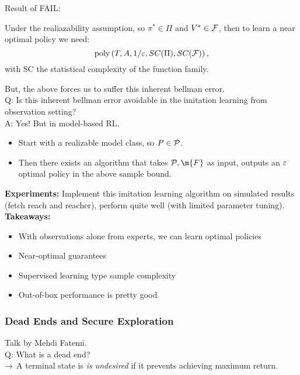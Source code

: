 Result of FAIL:
\begin{theorem}
Under the realiazability assumption, so $\pi^* \in \Pi$ and $V^* \in \mathcal{F}$, then to learn a near optimal policy we need:
\[
\text{poly}\left(T, A, 1/\varepsilon, SC(\Pi), SC(\mathcal{F})\right),
\]
with SC the statistical complexity of the function family.
\end{theorem}

But, the above forces us to suffer this inherent bellman error. \\

Q: Is this inherent bellman error avoidable in the imitation learning from observation setting? \\

A: Yes! But in model-based RL.
\begin{itemize}
    \item Start with a realizable model class, so $P \in \mathcal{P}$.
    \item Then there exists an algorithm that takes $\mc{P}, \m{F}$ as input, outputs an $\varepsilon$ optimal policy in the above sample bound.
\end{itemize}

{\bf Experiments:} Implement this imitation learning algorithm on simulated results (fetch reach and reacher), perform quite well (with limited parameter tuning). \\

{\bf Takeaways:}
\begin{itemize}
    \item With observations alone from experts, we can learn optimal policies
    \item Near-optimal guarantees
    \item Supervised learning type sample complexity
    \item Out-of-box performance is pretty good.
\end{itemize}

\spacerule

\subsubsection{Dead Ends and Secure Exploration~\cite{fatemi2019dead}}

Talk by Mehdi Fatemi. \\

Q: What is a dead end? \\

$\rightarrow$ A terminal state is {\it is undesired} if it prevents achieving maximum return. \\

